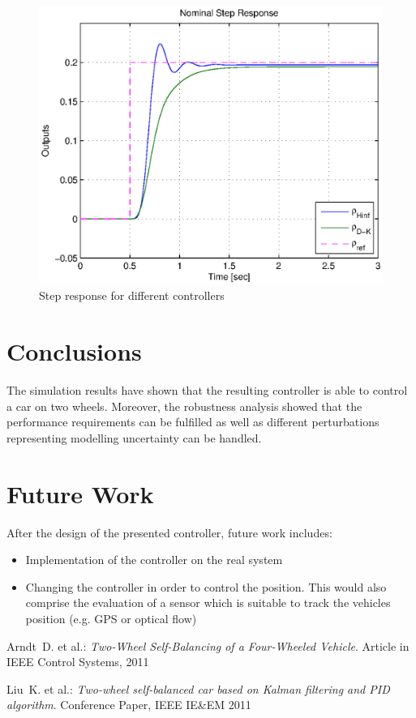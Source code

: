 \documentclass[conference]{IEEEtran}
\begin{document}
\begin{figure}[h]
\centering
  \includegraphics[width=.47\textwidth]{pics/step_comp_02} 
  \caption{Step response for different controllers}  
  \label{figure:step_comp_02}
\end{figure}


\section{Conclusions}

The simulation results have shown that the resulting controller is able to control a car on two wheels. Moreover, the robustness analysis showed that the performance requirements can be fulfilled as well as different perturbations representing modelling uncertainty can be handled.


\section{Future Work}

After the design of the presented controller, future work includes:

\begin{itemize}
\item Implementation of the controller on the real system
\item Changing the controller in order to control the position. This would also comprise the evaluation of a sensor which is suitable to track the vehicles position (e.g. GPS or optical flow)
\end{itemize}

 
 
 
\begin{thebibliography}{1}

 {\sc Arndt~D. et al.}: {\it Two-Wheel Self-Balancing of a Four-Wheeled Vehicle}. Article in IEEE Control Systems, 2011

 {\sc Liu~K. et al.}: {\it Two-wheel self-balanced car based on Kalman filtering and PID algorithm}. Conference Paper, IEEE IE\&EM 2011


\end{thebibliography}


\end{document}
